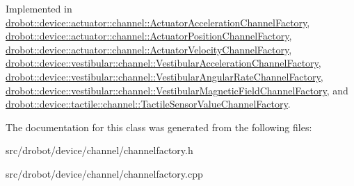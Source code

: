 Implemented in \hyperlink{classdrobot_1_1device_1_1actuator_1_1channel_1_1ActuatorAccelerationChannelFactory_a077744d3866b134b15cfe9522eeb99e3}{drobot\-::device\-::actuator\-::channel\-::\-Actuator\-Acceleration\-Channel\-Factory}, \hyperlink{classdrobot_1_1device_1_1actuator_1_1channel_1_1ActuatorPositionChannelFactory_a66d52953c14b0686b3dd61b9f8462476}{drobot\-::device\-::actuator\-::channel\-::\-Actuator\-Position\-Channel\-Factory}, \hyperlink{classdrobot_1_1device_1_1actuator_1_1channel_1_1ActuatorVelocityChannelFactory_ae60b06b9376c9b142137d97849dc8659}{drobot\-::device\-::actuator\-::channel\-::\-Actuator\-Velocity\-Channel\-Factory}, \hyperlink{classdrobot_1_1device_1_1vestibular_1_1channel_1_1VestibularAccelerationChannelFactory_a79214e8381183d99c9f27fc2abe41e59}{drobot\-::device\-::vestibular\-::channel\-::\-Vestibular\-Acceleration\-Channel\-Factory}, \hyperlink{classdrobot_1_1device_1_1vestibular_1_1channel_1_1VestibularAngularRateChannelFactory_a1a1dbc3b83511d7d50f7ff3e7bb12158}{drobot\-::device\-::vestibular\-::channel\-::\-Vestibular\-Angular\-Rate\-Channel\-Factory}, \hyperlink{classdrobot_1_1device_1_1vestibular_1_1channel_1_1VestibularMagneticFieldChannelFactory_a9eee36d4270b5beaa7e56a62bd916aa5}{drobot\-::device\-::vestibular\-::channel\-::\-Vestibular\-Magnetic\-Field\-Channel\-Factory}, and \hyperlink{classdrobot_1_1device_1_1tactile_1_1channel_1_1TactileSensorValueChannelFactory_a2e4369c57cdd99f2c59469f6451e4c0c}{drobot\-::device\-::tactile\-::channel\-::\-Tactile\-Sensor\-Value\-Channel\-Factory}.



The documentation for this class was generated from the following files\-:\begin{DoxyCompactItemize}
\item 
src/drobot/device/channel/channelfactory.\-h\item 
src/drobot/device/channel/channelfactory.\-cpp\end{DoxyCompactItemize}
